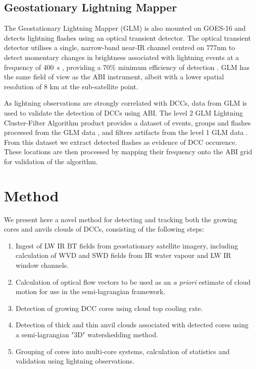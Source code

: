 \documentclass[amt, manuscript]{copernicus}
\begin{document}
\subsection{Geostationary Lightning Mapper}

The Geostationary Lightning Mapper (GLM) is also mounted on GOES-16 and detects lightning flashes using an optical transient detector.
The optical transient detector utilises a single, narrow-band near-IR channel centred on 777\unit{nm} \citep{orville_absolute_1984} to detect momentary changes in brightness associated with lightning events at a frequency of 400\unit{\mu s} \citep{christian_global_2003}, providing a 70\% minimum efficiency of detection \citep{goodman_goes-r_2013}.
GLM has the same field of view as the ABI instrument, albeit with a lower spatial resolution of 8 \unit{km} at the sub-satellite point.

As lightning observations are strongly correlated with DCCs, data from GLM is used to validate the detection of DCCs using ABI.
The level 2 GLM Lightning Cluster-Filter Algorithm product provides a dataset of events, groups and flashes processed from the GLM data \citep{peterson_research_2019}, and filters artifacts from the level 1 GLM data \citep{peterson_removing_2020}.
From this dataset we extract detected flashes as evidence of DCC occurence.
These locations are then processed by mapping their frequency onto the ABI grid for validation of the algorithm.

\section{Method}

We present here a novel method for detecting and tracking both the growing cores and anvils clouds of DCCs, consisting of the following steps:

\begin{enumerate}
    \item Ingest of LW IR BT fields from geostationary satellite imagery, including calculation of WVD and SWD fields from IR water vapour and LW IR window channels.
    \item Calculation of optical flow vectors to be used as an \textit{a priori} estimate of cloud motion for use in the semi-lagrangian framework.
    \item Detection of growing DCC cores using cloud top cooling rate.
    \item Detection of thick and thin anvil clouds associated with detected cores using a semi-lagrangian "3D" watershedding method. 
    \item Grouping of cores into multi-core systems, calculation of statistics and validation using lightning observations.
\end{enumerate}
\end{document}
